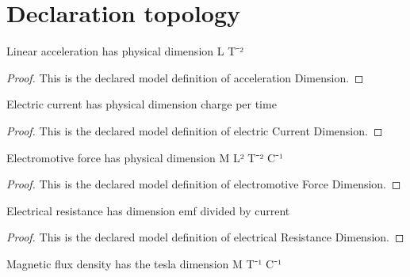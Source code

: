 \section{Declaration topology}
\begin{definition}
  \label{def:physics:phyx-mini-0976:phyxminiproblems-problemphyxmini0976-accelerationdimension}
  Linear acceleration has physical dimension L T⁻²
\end{definition}
\begin{proof}
  This is the declared model definition of acceleration Dimension.
\end{proof}
\begin{definition}
  \label{def:physics:phyx-mini-0976:phyxminiproblems-problemphyxmini0976-electriccurrentdimension}
  Electric current has physical dimension charge per time
\end{definition}
\begin{proof}
  This is the declared model definition of electric Current Dimension.
\end{proof}
\begin{definition}
  \label{def:physics:phyx-mini-0976:phyxminiproblems-problemphyxmini0976-electromotiveforcedimension}
  Electromotive force has physical dimension M L² T⁻² C⁻¹
\end{definition}
\begin{proof}
  This is the declared model definition of electromotive Force Dimension.
\end{proof}
\begin{definition}
  \label{def:physics:phyx-mini-0976:phyxminiproblems-problemphyxmini0976-electricalresistancedimension}
  Electrical resistance has dimension emf divided by current
\end{definition}
\begin{proof}
  This is the declared model definition of electrical Resistance Dimension.
\end{proof}
\begin{definition}
  \label{def:physics:phyx-mini-0976:phyxminiproblems-problemphyxmini0976-magneticfluxdensitydimension}
  Magnetic flux density has the tesla dimension M T⁻¹ C⁻¹
\end{definition}
